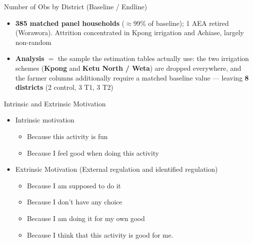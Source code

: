 \documentclass[aspectratio=169]{beamer}
\newcommand{\notefont}{\fontsize{5pt}{6pt}\selectfont}
\begin{document}
\begin{frame}{Number of Obs by District (Baseline / Endline)}
\begin{table}[hbtp]
	\centering
	\begin{threeparttable}
	\end{threeparttable}
\end{table}
\vspace{-4pt}
\begin{itemize}\notefont
	\item \textbf{385 matched panel households} ($\approx$99\% of baseline); 1 AEA retired (Worawora).
	      Attrition concentrated in Kpong irrigation and Achiase, largely non-random
	\item \textbf{Analysis} $=$ the sample the estimation tables actually use: the two irrigation
	      schemes (\textbf{Kpong} and \textbf{Ketu North / Weta}) are dropped everywhere, and the
	      farmer columns additionally require a matched baseline value --- leaving
	      \textbf{8 districts} (2 control, 3 T1, 3 T2)
\end{itemize}
\end{frame}

\begin{frame}{Intrinsic and Extrinsic Motivation}
	\begin{itemize}
		\item Intrinsic motivation
		\begin{itemize}
			\item Because this activity is fun 
			\item Because I feel good when doing this activity
			\vspace{0.3cm}
		\end{itemize}
		\item Extrinsic Motivation (External regulation and identified regulation)
		\begin{itemize}
			\item Because I am supposed to do it
			\item Because I don't have any choice
			\item Because I am doing it for my own good 
			\item Because I think that this activity is good for me. 
		\end{itemize}
		
		
		
	\end{itemize}
\end{frame}
\end{document}

